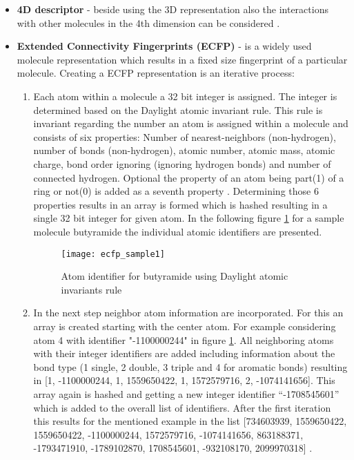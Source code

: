 \documentclass[../main.tex]{subfiles}
\begin{document}
\begin{itemize}
    \item \textbf{4D descriptor} - beside using the 3D representation also the interactions with other molecules in the 4th dimension can be considered \cite{carracedo-reboredo_review_2021}.

    \item \textbf{Extended Connectivity Fingerprints (ECFP)} - is a widely used molecule representation which results in a fixed size fingerprint of a particular molecule. Creating a ECFP representation is an iterative process:

    \begin{enumerate}
        \item Each atom within a molecule a 32 bit integer is assigned. The integer is determined based on the Daylight atomic invariant rule. This rule is invariant regarding the number an atom is assigned within a molecule and consists of six properties: Number of nearest-neighbors (non-hydrogen), number of bonds (non-hydrogen), atomic number, atomic mass, atomic charge, bond order ignoring (ignoring hydrogen bonds) and number of connected hydrogen. Optional the property of an atom being part(1) of a ring or not(0) is added as a seventh property \cite{sihag_beginners_2021}. Determining those 6 properties results in an array is formed which is hashed resulting in a single 32 bit integer for given atom. In the following figure \ref{fig:ecfp_sample1} for a sample molecule butyramide the individual atomic identifiers are presented.

        \begin{figure}[H]
            \centering
            \texttt{[image: ecfp\_sample1]}    
            \caption{Atom identifier for butyramide using Daylight atomic invariants rule \cite{rogers_extended-connectivity_2010}}
            \label{fig:ecfp_sample1}
        \end{figure}

        \item In the next step neighbor atom information are incorporated. For this an array is created starting with the center atom. For example considering atom 4 with identifier "-1100000244" in figure \ref{fig:ecfp_sample1}. All neighboring atoms with their integer identifiers are added including information about the bond type (1 single, 2 double, 3 triple and 4 for aromatic bonds) resulting in [1, -1100000244, 1, 1559650422, 1, 1572579716, 2, -1074141656]. This array again is hashed and getting a new integer identifier “-1708545601” which is added to the overall list of identifiers. After the first iteration this results for the mentioned example in the list [734603939, 1559650422, 1559650422, -1100000244, 1572579716, -1074141656, 863188371, -1793471910, -1789102870,  1708545601, -932108170, 2099970318] \cite{rogers_extended-connectivity_2010}.
        

\end{enumerate}
\end{itemize}
\end{document}
